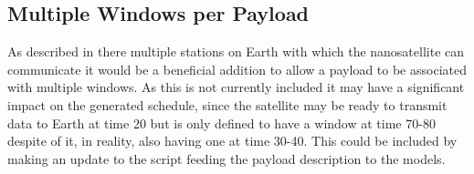 \subsection*{Multiple Windows per Payload}\label{ssec:multi_window}
As described in  there multiple stations on Earth with which the nanosatellite can communicate it would be a beneficial addition to allow a payload to be associated with multiple windows. As this is not currently included it may have a significant impact on the generated schedule, since the satellite may be ready to transmit data to Earth at time 20 but is only defined to have a window at time 70-80 despite of it, in reality, also having one at time 30-40. This could be included by making an update to the script feeding the payload description to the models.

